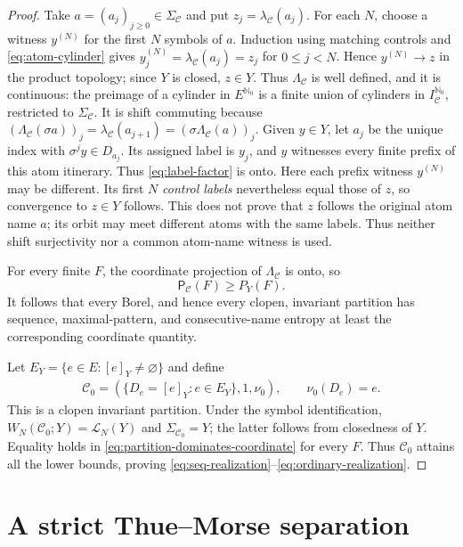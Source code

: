 \documentclass[11pt,reqno]{amsart}
\numberwithin{equation}{section}
\theoremstyle{definition}
\newcommand{\Nzero}{\mathbb N_0}
\newcommand{\C}{\mathcal C}
\newcommand{\Lcal}{\mathcal L}
\newcommand{\Patt}{\mathsf P}
\begin{document}
\begin{proof}
Take $a=(a_j)_{j\ge0}\in\Sigma_\C$ and put $z_j=\lambda_\C(a_j)$.  For each
$N$, choose a witness $y^{(N)}$ for the first $N$ symbols of $a$.  Induction
using matching controls and \eqref{eq:atom-cylinder} gives
$y^{(N)}_j=\lambda_\C(a_j)=z_j$ for $0\le j<N$.  Hence
$y^{(N)}\to z$ in the product topology; since $Y$ is closed, $z\in Y$.  Thus
$\Lambda_\C$ is well defined, and it is continuous: the preimage of a cylinder in $E^{\Nzero}$ is a finite
union of cylinders in $I_\C^{\Nzero}$, restricted to $\Sigma_\C$.
It is shift commuting because
$(\Lambda_\C(\sigma a))_j=\lambda_\C(a_{j+1})
=(\sigma\Lambda_\C(a))_j$.  Given $y\in Y$, let $a_j$ be the unique index with
$\sigma^j y\in D_{a_j}$.  Its assigned label is $y_j$, and $y$ witnesses
every finite prefix of this atom itinerary.  Thus \eqref{eq:label-factor} is onto.  Here each prefix witness $y^{(N)}$ may be different. Its first $N$
\emph{control labels} nevertheless equal those of $z$, so convergence to
$z\in Y$ follows. This does not prove that $z$ follows the original atom
name $a$; its orbit may meet different atoms with the same labels.
Thus neither shift surjectivity nor a common atom-name witness is used.

For every finite $F$, the coordinate projection of $\Lambda_\C$ is onto, so
\begin{equation}\label{eq:partition-dominates-coordinate}
 \Patt_\C(F)\ge P_Y(F).
\end{equation}
It follows that every Borel, and hence every clopen, invariant partition has
sequence, maximal-pattern, and consecutive-name entropy at least the
corresponding coordinate quantity.

Let $E_Y=\{e\in E:[e]_Y\ne\varnothing\}$ and define
\begin{align*}
\C_0=(\{D_e=[e]_Y:e\in E_Y\},1,\nu_0),
 \qquad \nu_0(D_e)=e.
\end{align*}
This is a clopen invariant partition.  Under the symbol identification,
$W_N(\C_0;Y)=\Lcal_N(Y)$ and $\Sigma_{\C_0}=Y$; the latter follows from
closedness of $Y$.  Equality holds in \eqref{eq:partition-dominates-coordinate}
for every $F$.  Thus $\C_0$ attains all the lower bounds, proving
\eqref{eq:seq-realization}--\eqref{eq:ordinary-realization}.
\end{proof}

\section{A strict Thue--Morse separation}\label{sec:thue-morse}
\end{document}
